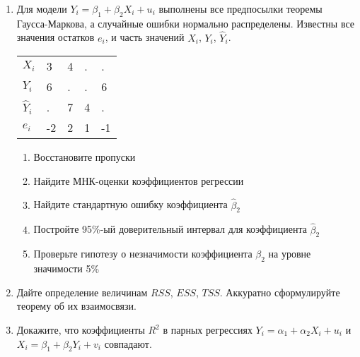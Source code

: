 \documentclass[12pt]{article}\usepackage[]{graphicx}\usepackage[svgnames]{xcolor}
\begin{document}
\begin{enumerate}
\item Для модели $Y_i = \beta_1 + \beta_2 X_i + u_i$ выполнены все предпосылки теоремы Гаусса-Маркова, а случайные ошибки нормально распределены. Известны все значения остатков $e_i$, и часть значений $X_i$, $Y_i$, $\hat Y_i$.

\begin{tabular}{lllll}
\toprule
$X_i$       & 3 & 4 & . & . \\
$Y_i$       & 6 & . & . & 6 \\
$\hat Y_i$ & . & 7 & 4 & . \\
$e_i$       & -2 & 2 & 1 & -1 \\
\bottomrule
\end{tabular}

\begin{enumerate}
\item Восстановите пропуски
\item Найдите МНК-оценки коэффициентов регрессии
\item Найдите стандартную ошибку коэффициента $\hat \beta_2$
\item Постройте 95\%-ый доверительный интервал для коэффициента $\hat \beta_2$
\item Проверьте гипотезу о незначимости коэффициента $\beta_2$ на уровне значимости 5\%
\end{enumerate}


\item Дайте определение величинам $RSS$, $ESS$, $TSS$. Аккуратно сформулируйте теорему об их взаимосвязи.

\item Докажите, что коэффициенты $R^2$ в парных регрессиях $Y_i = \alpha_1 + \alpha_2 X_i + u_i$ и $X_i = \beta_1 + \beta_2 Y_i + v_i$ совпадают.

\end{enumerate}
\end{document}

